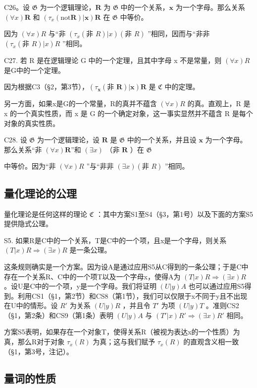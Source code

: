 C26。设 \(\mathfrak{G}\) 为一个逻辑理论，\(\pmb{R}\) 为 \(\mathfrak{G}\) 中的一个关系，\(\pmb{x}\) 为一个字母。那么关系 \((\forall x)\pmb{R}\) 和 \((\tau_{x}(\mathrm{not}\pmb{R})|\pmb{x})\pmb{R}\) 在 \(\mathfrak{G}\) 中等价。

因为 \((\forall x)R\) 与“非 \((\tau_{x}(\text{非 } R)|x)(\text{非 } R)\) ”相同，因而与“非非 \((\tau_{x}(\text{非 } R)|x)R\) ”相同。

C27. 若 R 是在逻辑理论 G 中的一个定理，且其中字母 x 不是常量，则 \((\forall x)R\) 是G中的一个定理。

因为根据C3（§2，第3节），\((\tau_{\pmb{x}}(\text{非 } \pmb{R})|\pmb{x})\pmb{R}\) 是 \(\mathfrak{C}\) 中的定理。

另一方面，如果x是G的一个常量，R的真并不蕴含 \((\forall x)R\) 的真。直观上，R 是 x 的一个真实性质，而 x 是 G 的一个确定对象，这一事实显然并不蕴含 R 是每个对象的真实性质。

C28. 设 \(\mathfrak{G}\) 为一个逻辑理论，设 \(\pmb{R}\) 是 \(\mathfrak{G}\) 中的一个关系，并且设 \(\pmb{x}\) 为一个字母。那么关系“非 \((\forall x)\pmb{R}\)”和 \((\exists x)\) （非 \(\pmb{R}\) ）在 \(\mathfrak{G}\)

中等价。因为“非 \((\forall x)R\) ”与“非非 \((\exists x)(\text{非 } R)\) ”相同。

\subsection{量化理论的公理}

量化理论是任何这样的理论 \(\mathfrak{C}\) ：其中方案S1至S4（§3，第1号）以及下面的方案S5提供隐式公理。

S5. 如果R是C中的一个关系，T是C中的一个项，且x是一个字母，则关系 \((T|x)R \Longrightarrow (\exists x)R\) 是一条公理。

这条规则确实是一个方案。因为设A是通过应用S5从C得到的一条公理；于是C中存在一个关系R、C中的一个项T以及一个字母x，使得A为 \((T|x)R \Longrightarrow (\exists x)R\) 。设U是C中的一个项，y是一个字母。我们将证明 \((U|y)A\) 也可以通过应用S5得到。利用CS1（§1，第2节）和CS8（第1节），我们可以仅限于x不同于y且不出现在U中的情形。设 \(R'\) 为关系 \((U|y)R\) ，并且令 \(T'\) 为项 \((U|y)T\) 。准则CS2（§1，第2条）和CS9（第1条）表明 \((U|y)A\) 与 \((T'|x)R' \Longrightarrow (\exists x)R'\) 相同。

方案S5表明，如果存在一个对象T，使得关系R（被视为表达x的一个性质）为真，那么R对于对象 \(\tau_{x}(R)\) 为真；这与我们赋予 \(\tau_{x}(R)\) 的直观含义相一致（§1，第3号，注记）。

\subsection{量词的性质}

